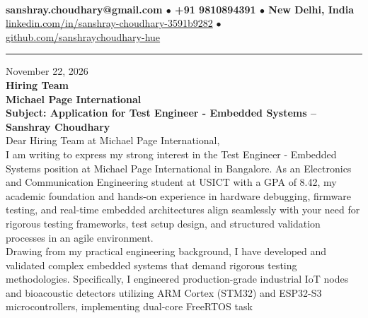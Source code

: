 \documentclass[10pt,a4paper]{article}%
\begin{document}
%
 \vspace{3pt}\\%
\noindent \textbf{\footnotesize sanshray.choudhary@gmail.com $\bullet$ +91 9810894391 $\bullet$ New Delhi, India}\\%
\noindent \href{https://www.linkedin.com/in/sanshray-choudhary-3591b9282}{linkedin.com/in/sanshray-choudhary-3591b9282} $\bullet$ \href{https://github.com/sanshraychoudhary-hue}{github.com/sanshraychoudhary-hue} \vspace{12pt}%
\hrule \vspace{18pt}%

\noindent November 22, 2026 \vspace{12pt}\\%
\noindent \textbf{Hiring Team} \\%
\noindent \textbf{Michael Page International} \vspace{16pt}\\%

\noindent \textbf{Subject: Application for Test Engineer - Embedded Systems -- Sanshray Choudhary} \vspace{12pt}\\%

\noindent Dear Hiring Team at Michael Page International, \vspace{8pt}\\%

\noindent I am writing to express my strong interest in the Test Engineer - Embedded Systems position at Michael Page International in Bangalore. As an Electronics and Communication Engineering student at USICT with a GPA of 8.42, my academic foundation and hands-on experience in hardware debugging, firmware testing, and real-time embedded architectures align seamlessly with your need for rigorous testing frameworks, test setup design, and structured validation processes in an agile environment. \vspace{8pt}\\

\noindent Drawing from my practical engineering background, I have developed and validated complex embedded systems that demand rigorous testing methodologies. Specifically, I engineered production-grade industrial IoT nodes and bioacoustic detectors utilizing ARM Cortex (STM32) and ESP32-S3 microcontrollers, implementing dual-core FreeRTOS task \vspace{8pt}\\
\end{document}
